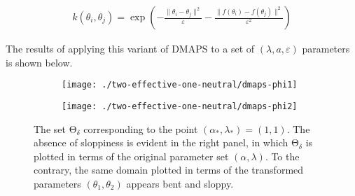 \documentclass[11pt]{article}
\newcommand{\ps}{\mathrm{\Theta}}
\newcommand{\p}{\theta}
\newcommand{\eps}{\varepsilon}
\begin{document}
\begin{align*}
  k(\theta_i, \theta_j) = \exp(- \frac{\|\theta_i -
  \theta_j\|^2}{\eps}  - \frac{\|f(\theta_i) - f(\theta_j)\|^2}{\eps^2})
\end{align*}

The results of applying this variant of DMAPS to a set of $(\lambda,
a, \eps)$ parameters is shown below.


\begin{figure}[ht!]
  \begin{subfigure}[t]{0.49\textwidth}
    \centering
    \texttt{[image: ./two-effective-one-neutral/dmaps-phi1]}
  \end{subfigure}
  \begin{subfigure}[t]{0.49\textwidth}
    \centering
    \texttt{[image: ./two-effective-one-neutral/dmaps-phi2]}
  \end{subfigure} %
  \caption{The set $\ps_\delta$ corresponding to the point
    $(\alpha_*,\lambda_*) = (1,1)$. The absence of
    sloppiness is evident in the right panel, in which $\ps_\delta$ is
    plotted in terms of the original parameter set
    $(\alpha,\lambda)$. To the contrary, the same domain plotted in
    terms of the transformed parameters $(\p_1,\p_2)$ appears bent and
    sloppy. \label{f.transf-params}}
\end{figure}

% 
% 
\end{document}
